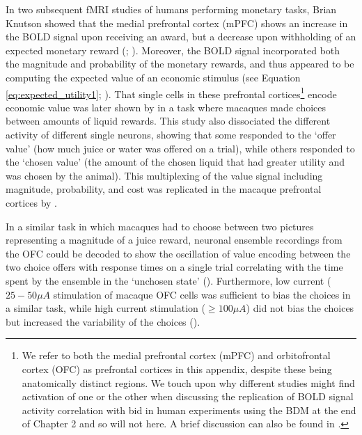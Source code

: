 In two subsequent fMRI studies of humans performing monetary tasks, Brian Knutson showed that the medial prefrontal cortex (mPFC) shows an increase in the BOLD signal upon receiving an award, but a decrease upon withholding of an expected monetary reward (\cite{knutsonRegionMesialPrefrontal2003}; \cite{knutsonDistributedNeuralRepresentation2005}). Moreover, the BOLD signal incorporated both the magnitude and probability of the monetary rewards, and thus appeared to be computing the expected value of an economic stimulus (see Equation \ref{eq:expected_utility1}; \cite{knutsonDistributedNeuralRepresentation2005}). That single cells in these prefrontal cortices\footnote{We refer to both the medial prefrontal cortex (mPFC) and orbitofrontal cortex (OFC) as prefrontal cortices in this appendix, despite these being anatomically distinct regions. We touch upon why different studies might find activation of one or the other when discussing the replication of BOLD signal activity correlation with bid in human experiments using the BDM at the end of Chapter 2 and so will not here. A brief discussion can also be found in \cite{padoaschioppaOrbitofrontalCortexNeural2017}.} encode economic value was later shown by \cite{padoaschioppaNeuronsOrbitofrontalCortex2006} in a task where macaques made choices between amounts of liquid rewards. This study also dissociated the different activity of different single neurons, showing that some responded to the ‘offer value’ (how much juice or water was offered on a trial), while others responded to the ‘chosen value’ (the amount of the chosen liquid that had greater utility and was chosen by the animal). This multiplexing of the value signal including magnitude, probability, and cost was replicated in the macaque prefrontal cortices by \cite{kennerleyEncodingRewardSpace2009}.

In a similar task in which macaques had to choose between two pictures representing a magnitude of a juice reward, neuronal ensemble recordings from the OFC could be decoded to show the oscillation of value encoding between the two choice offers with response times on a single trial correlating with the time spent by the ensemble in the ‘unchosen state’ (\cite{richDecodingSubjectiveDecisions2016}). Furthermore, low current ($25-50\mu A$ stimulation of macaque OFC cells was sufficient to bias the choices in a similar task, while high current stimulation ($\geq 100 \mu A$) did not bias the choices but increased the variability of the choices (\cite{ballestaValuesEncodedOrbitofrontal2020}).

